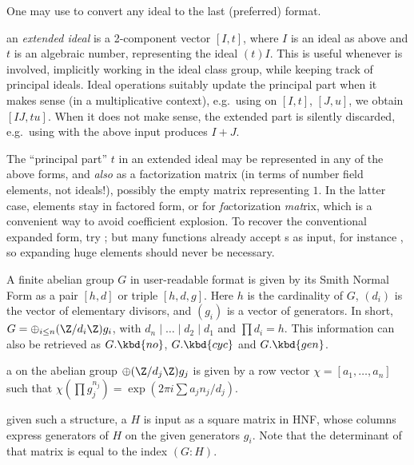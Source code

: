 One may use  to convert any ideal to the last (preferred) format.

\item an \emph{extended ideal}  is a 2-component
vector $[I, t]$, where $I$ is an ideal as above and $t$ is an algebraic
number, representing the ideal $(t)I$. This is useful whenever 
is involved, implicitly working in the ideal class group, while keeping track
of principal ideals. Ideal operations suitably update the principal part
when it makes sense (in a multiplicative context), e.g.~using 
on $[I,t]$, $[J,u]$, we obtain $[IJ, tu]$. When it does not make sense, the
extended part is silently discarded, e.g.~using  with the above
input produces $I+J$.

The ``principal part'' $t$ in an extended ideal may be
represented in any of the above forms, and \emph{also} as a factorization
matrix (in terms of number field elements, not ideals!), possibly the empty
matrix \kbd{[;]} representing $1$. In the latter case, elements stay in
factored form, or  for \emph{fa}ctorization \emph{mat}rix, which
is a convenient way to avoid coefficient explosion. To recover the
conventional expanded form, try ; but many functions
already accept s as input, for instance , so
expanding huge elements should never be necessary.


A finite abelian group $G$ in user-readable format is given by its Smith
Normal Form as a pair $[h,d]$ or triple $[h,d,g]$.
Here $h$ is the cardinality of $G$, $(d_i)$ is the vector of elementary
divisors, and $(g_i)$ is a vector of generators. In short,
$G = \oplus_{i\leq n} (\Z/d_i\Z) g_i$, with $d_n \mid \dots \mid d_2 \mid d_1$
and $\prod d_i = h$. This information can also be retrieved as
$G.\kbd{no}$, $G.\kbd{cyc}$ and $G.\kbd{gen}$.

\item a  on the abelian group
$\oplus (\Z/d_j\Z) g_j$
is given by a row vector $\chi = [a_1,\ldots,a_n]$ such that
$\chi(\prod g_j^{n_j}) = \exp(2\pi i\sum a_j n_j / d_j)$.

\item given such a structure, a  $H$ is input as a square
matrix in HNF, whose columns express generators of $H$ on the given generators
$g_i$. Note that the determinant of that matrix is equal to the index $(G:H)$.

